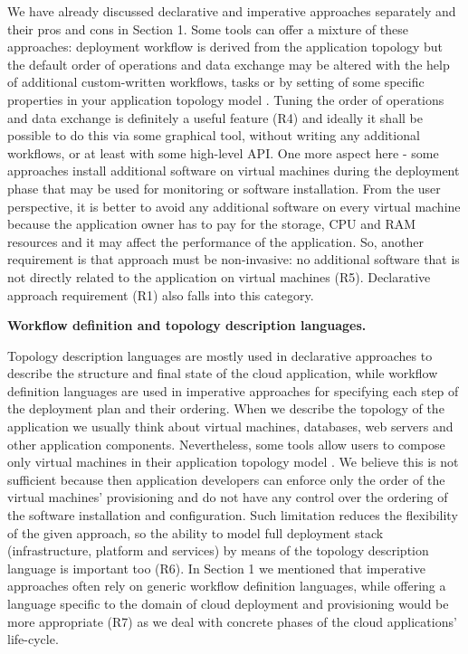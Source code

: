\noindent We have already discussed declarative and imperative approaches separately and their pros and cons in Section 1. Some tools can offer a mixture of these approaches: deployment workflow is derived from the application topology but the default order of operations and data exchange may be altered with the help of additional custom-written workflows, tasks or by setting of some specific properties in your application topology model \cite{juve2011automating, Breitenbuecher2014}. Tuning the order of operations and data exchange is definitely a useful feature (R4) and ideally it shall be possible to do this via some graphical tool, without writing any additional workflows, or at least with some high-level API. One more aspect here - some approaches install additional software on virtual machines during the deployment phase that may be used for monitoring or software installation. From the user perspective, it is better to avoid any additional software on every virtual machine because the application owner has to pay for the storage, CPU and RAM resources and it may affect the performance of the application. So, another requirement is that approach must be non-invasive: no additional software that is not directly related to the application on virtual machines (R5). Declarative approach requirement (R1) also falls into this category.

\noindent 

\noindent \textbf{Workflow definition and topology description languages.}

\noindent Topology description languages are mostly used in declarative approaches to describe the structure and final state of the cloud application, while workflow definition languages are used in imperative approaches for specifying each step of the deployment plan and their ordering. When we describe the topology of the application we usually think about virtual machines, databases, web servers and other application components. Nevertheless, some tools allow users to compose only virtual machines in their application topology model \cite{juve2011automating, konstantinou2009architecture}. We believe this is not sufficient because then application developers can enforce only the order of the virtual machines' provisioning and do not have any control over the ordering of the software installation and configuration. Such limitation reduces the flexibility of the given approach, so the ability to model full deployment stack (infrastructure, platform and services) by means of the topology description language is important too (R6). In Section 1 we mentioned that imperative approaches often rely on generic workflow definition languages, while offering a language specific to the domain of cloud deployment and provisioning would be more appropriate (R7) as we deal with concrete phases of the cloud applications' life-cycle. 

